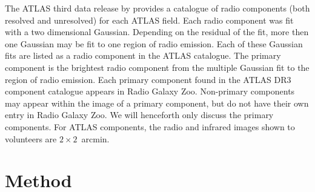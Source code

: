\documentclass[fleqn,usenatbib,usedcolumn]{mnras}
\begin{document}
    The ATLAS third data release by \citet{franzen15} provides a catalogue of radio components (both resolved and unresolved) for each ATLAS field.  Each radio component was fit with a two dimensional Gaussian. Depending on the residual of the fit, more then one Gaussian may be fit to one region of radio emission.  Each of these Gaussian fits are listed as a radio component in the ATLAS catalogue.  The primary component is the brightest radio component from the multiple Gaussian fit to the region of radio emission. Each primary
    component found in the ATLAS DR3 component catalogue appears in Radio Galaxy
    Zoo. Non-primary components may appear within the image of a primary
    component, but do not have their own entry in Radio Galaxy Zoo. We will
    henceforth only discuss the primary components. For ATLAS components, the
    radio and infrared images shown to volunteers are $2 \times 2$~arcmin.

  \section{Method}\label{sec:method}
    
\end{document}
